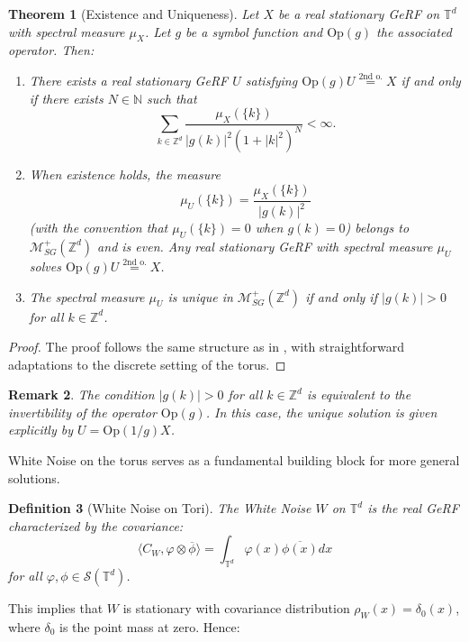 \documentclass[pdflatex,sn-mathphys,Numbered]{sn-jnl}
\theoremstyle{thmstyleone}%
\newtheorem{theorem}{Theorem}[section]%
\theoremstyle{thmstyletwo}%
\newtheorem{remark}[theorem]{Remark}%
\theoremstyle{thmstylethree}%
\newtheorem{definition}[theorem]{Definition}%
\newcommand{\ZZ}{\mathbb{Z}}
\newcommand{\NN}{\mathbb{N}}
\newcommand{\TT}{\mathbb{T}}
\newcommand{\calS}{\mathcal{S}}
\newcommand{\calM}{\mathcal{M}}
\newcommand{\Op}{\mathrm{Op}}
\newcommand{\eqso}{\stackrel{\text{2nd o.}}{=}}
\begin{document}
\begin{appendices}
\begin{theorem}[Existence and Uniqueness]\label{thm:main}
Let $X$ be a real stationary GeRF on $\TT^d$ with spectral measure $\mu_X$. Let $g$ be a symbol function and $\Op(g)$ the associated operator. Then:

\begin{enumerate}
\item[(i)] There exists a real stationary GeRF $U$ satisfying $\Op(g) U \eqso X$ if and only if there exists $N \in \NN$ such that
$$\sum_{k \in \ZZ^d} \frac{\mu_X(\{k\})}{|g(k)|^2(1+|k|^2)^N} < \infty.$$

\item[(ii)] When existence holds, the measure
$$\mu_U(\{k\}) = \frac{\mu_X(\{k\})}{|g(k)|^2}$$
(with the convention that $\mu_U(\{k\}) = 0$ when $g(k) = 0$) belongs to $\calM_{SG}^+(\ZZ^d)$ and is even. Any real stationary GeRF with spectral measure $\mu_U$ solves $\Op(g) U \eqso X$.

\item[(iii)] The spectral measure $\mu_U$ is unique in $\calM_{SG}^+(\ZZ^d)$ if and only if $|g(k)| > 0$ for all $k \in \ZZ^d$.
\end{enumerate}
\end{theorem}

\begin{proof}
The proof follows the same structure as in \cite{gerfs}, with straightforward adaptations to the discrete setting of the torus.
\end{proof}

\begin{remark}
The condition $|g(k)| > 0$ for all $k \in \ZZ^d$ is equivalent to the invertibility of the operator $\Op(g)$. In this case, the unique solution is given explicitly by $U = \Op(1/g)X$.
\end{remark}

White Noise on the torus serves as a fundamental building block for more general solutions.

\begin{definition}[White Noise on Tori]\label{def:white-noise}
The White Noise $W$ on $\TT^d$ is the real GeRF characterized by the covariance:
$$\langle C_W, \varphi \otimes \overline{\phi} \rangle = \int_{\TT^d} \varphi(x)\overline{\phi(x)} dx$$
for all $\varphi, \phi \in \calS(\TT^d)$.
\end{definition}

This implies that $W$ is stationary with covariance distribution $\rho_W(x) =
\delta_0(x)$, where $\delta_0$ is the point mass at zero. Hence:


\end{appendices}
\end{document}
